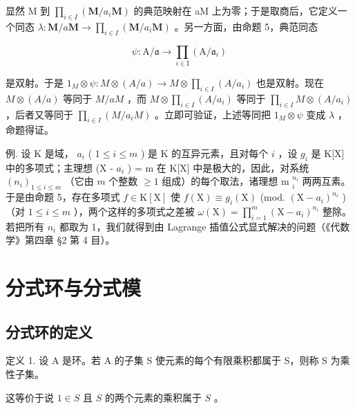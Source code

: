 显然 M 到 \(\prod_{i\in I}(\mathbf{M} / a_i\mathbf{M})\) 的典范映射在 aM 上为零；于是取商后，它定义一个同态 \(\lambda : \mathbf{M} / a\mathbf{M}\to \prod_{i\in I}(\mathbf{M} / a_i\mathbf{M})\) 。另一方面，由命题 5，典范同态

\[
\psi \colon \mathrm{A} / \mathfrak {a} \rightarrow \prod_ {i \in \mathrm{I}} (\mathrm{A} / \mathfrak {a} _ {i})
\]

是双射。于是 \(1_{M} \otimes \psi: M \otimes (A/a) \to M \otimes \prod_{i \in I} (A/a_i)\) 也是双射。现在 \(M \otimes (A/a)\) 等同于 \(M/aM\) ，而 \(M \otimes \prod_{i \in I} (A/a_i)\) 等同于 \(\prod_{i \in I} M \otimes (A/a_i)\) ，后者又等同于 \(\prod_{i \in I} (M/a_iM)\) 。立即可验证，上述等同把 \(1_M \otimes \psi\) 变成 \(\lambda\) ，命题得证。

例. 设 K 是域， \(a_{i}\) ( \(1 \leqslant i \leqslant m\) ) 是 K 的互异元素，且对每个 \(i\) ，设 \(g_{i}\) 是 K{[}X{]} 中的多项式；主理想 (X - \(a_{i}\) ) = m 在 K{[}X{]} 中是极大的，因此，对系统 \((n_{i})_{1 \leqslant i \leqslant m}\) （它由 \(m\) 个整数 \(\geqslant 1\) 组成）的每个取法，诸理想 m \(_{i}^{n_{i}}\) 两两互素。于是由命题 5，存在多项式 \(f \in \mathrm{K}[\mathrm{X}]\) 使 \(f(\mathrm{X}) \equiv g_{i}(\mathrm{X})\) (mod. \((\mathrm{X} - a_{i})^{n_{i}}\) ) （对 \(1 \leqslant i \leqslant m\) ），两个这样的多项式之差被 \(\omega(\mathrm{X}) = \prod_{i=1}^{m} (\mathrm{X} - a_{i})^{n_{i}}\) 整除。若把所有 \(n_{i}\) 都取为 1，我们就得到由 Lagrange 插值公式显式解决的问题（《代数学》第四章 §2 第 4 目）。

\section{分式环与分式模}

\subsection{分式环的定义}

定义 1. 设 A 是环。若 A 的子集 S 使元素的每个有限乘积都属于 S，则称 S 为乘性子集。

这等价于说 \(1 \in S\) 且 \(S\) 的两个元素的乘积属于 \(S\) 。
